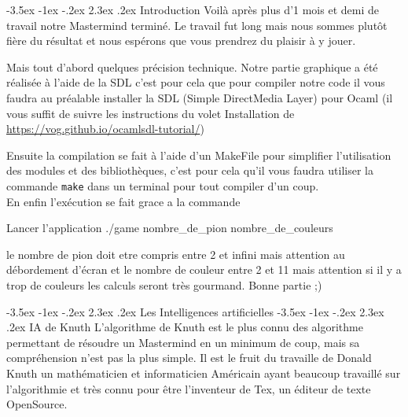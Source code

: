 \documentclass[11pt, a4paper]{article}
\makeatletter
\renewcommand{\section}{\@startsection{section}{1}{\z@}%
          {-3.5ex \@plus -1ex \@minus -.2ex}%
          {2.3ex \@plus .2ex}%
          {\reset@font\Large\bfseries	}}
\renewcommand{\subsection}{\@startsection{subsection}{1}{\z@}%
          {-3.5ex \@plus -1ex \@minus -.2ex}%
          {2.3ex \@plus .2ex}%
          {\reset@font\large\bfseries}}
\makeatother
\begin{document}
\tableofcontents

\section{Introduction} 
Voilà après plus d’1 mois et demi de travail notre Mastermind terminé. 
Le travail fut long mais nous sommes plutôt fière du résultat et nous espérons que vous prendrez du plaisir à y jouer.

\vspace{3  mm}


Mais tout d’abord quelques précision technique. 
Notre partie graphique a été réalisée à l’aide de la SDL c’est pour cela que pour compiler notre code
il vous faudra au préalable installer la SDL (Simple DirectMedia Layer) pour Ocaml (il vous suffit de suivre
les instructions du volet Installation de \url{https://vog.github.io/ocamlsdl-tutorial/})

\vspace{3  mm}

Ensuite la compilation se fait à l’aide d’un MakeFile pour simplifier l’utilisation des modules et des bibliothèques, 
c’est pour cela qu’il vous faudra utiliser la commande \texttt{make} dans un terminal pour tout compiler d’un coup.\\
En enfin l’exécution se fait grace a la commande\\

\begin{bashCode}{Lancer l'application} 
./game nombre_de_pion nombre_de_couleurs
\end{bashCode} 


le nombre de pion doit etre compris entre 2 et infini mais attention au débordement d’écran et le nombre de couleur entre 2 et 11 mais attention si il y a trop de couleurs 
les calculs seront très gourmand. Bonne partie ;)

\section{Les Intelligences artificielles} 
\subsection{IA de Knuth}
L’algorithme de Knuth est le plus connu des algorithme permettant de résoudre un Mastermind en un minimum de coup, 
mais sa compréhension n’est pas la plus simple. Il est le fruit du travaille de Donald Knuth un mathématicien et informaticien Américain
ayant beaucoup travaillé sur l’algorithmie et très connu pour être l’inventeur de Tex, un éditeur de texte OpenSource. 
\end{document}
